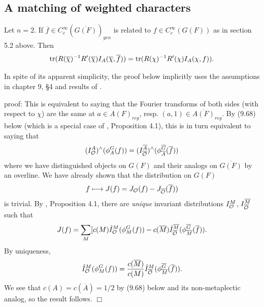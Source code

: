 \subsection{A matching of weighted characters}

\begin{lemma}
Let $n=2$. If $\overline{f}\in C^\infty_c(\overline{G(F)})_{gen}$
is related to $f\in C_c^\infty(G(F))$ as in section 5.2
above. Then
\[
{\rm tr}(R(\overline{\chi})^{-1}R'(\overline{\chi})
I_A(\overline{\chi},\overline{f}))=
{\rm tr}(R(\chi)^{-1}R'(\chi)I_A(\chi,f)).
\]
\end{lemma}

\begin{remark} In spite of its apparent simplicity, the proof
below implicitly uses the assumptions in chapter 9, \S 4
and results of \cite{A6}.
\end{remark}

proof: This is equivalent to saying that the Fourier transforms of both
sides (with respect to $\chi$) are the same at $a\in A(F)_{reg}$,
resp. $(a,1)\in \overline{A(F)}_{reg}$.
By (9.68) below (which is a special case of
\cite{A6}, Proposition 4.1), this is in turn equivalent to saying that
\begin{equation}
(I_{\cal{O}}^A)^\wedge(\phi_A^G(f))
=(I_{\overline{\cal{O}}}^{\overline{A}})^\wedge
(\phi_{\overline{A}}^{\overline{G}}(\overline{f}))
\end{equation}
where we have distinguished objects on $G(F)$ and their analogs on
$\overline{G(F)}$ by an overline. We have already shown that
the distribution on $G(F)$
\[
f\longmapsto J(f)=J_{\cal{O}}(f)-
J_{\overline{\cal{O}}}(\overline{f}))
\]
is trivial. By \cite{A6}, Proposition 4.1, there are {\em unique}
invariant distributions
$I_{\cal{O}}^{M}$, $I_{\overline{\cal{O}}}^{\overline{M}}$ such that
\[
J(f)=\sum_M [ c(M)\hat{I}_{\cal{O}}^M(\phi_M^G(f))-
 c(\overline{M})\hat{I}_{\overline{\cal{O}}}^{\overline{M}}
(\phi_{\overline{M}}^{\overline{G}}(\overline{f})).
\]
By uniqueness,
\[
\hat{I}_{\cal{O}}^M(\phi_M^G(f))
={c(\overline{M})\over c(M)}
\hat{I}_{\overline{\cal{O}}}^M
(\phi_{\overline{M}}^{\overline{G}}(\overline{f})).
\]
We see that $c(A)=c(\overline{A})=1/2$ by (9.68) below
and its non-metaplectic analog, so the result follows. $\Box$



